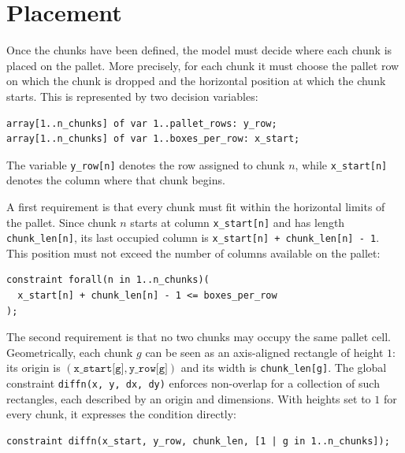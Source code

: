 \section{Placement}
\label{sec:placement}

Once the chunks have been defined, the model must decide where each chunk is
placed on the pallet. More precisely, for each chunk it must choose the pallet
row on which the chunk is dropped and the horizontal position at which the chunk
starts. This is represented by two decision variables:

\vspace{0.5cm}
\begin{lstlisting}
array[1..n_chunks] of var 1..pallet_rows: y_row;
array[1..n_chunks] of var 1..boxes_per_row: x_start;
\end{lstlisting}
\vspace{0.5cm}

The variable \texttt{y\_row[n]} denotes the row assigned to chunk \(n\), while
\texttt{x\_start[n]} denotes the column where that chunk begins.

A first requirement is that every chunk must fit within the horizontal limits of
the pallet. Since chunk \(n\) starts at column \texttt{x\_start[n]} and has
length \texttt{chunk\_len[n]}, its last occupied column is
\texttt{x\_start[n] + chunk\_len[n] - 1}. This position must not exceed the
number of columns available on the pallet:

\vspace{0.5cm}
\begin{lstlisting}
constraint forall(n in 1..n_chunks)(
  x_start[n] + chunk_len[n] - 1 <= boxes_per_row
);
\end{lstlisting}
\vspace{0.5cm}

The second requirement is that no two chunks may occupy the same pallet
cell. Geometrically, each chunk \(g\) can be seen as an axis-aligned
rectangle of height \(1\): its origin is \((\texttt{x\_start[g]},
\texttt{y\_row[g]})\) and its width is \texttt{chunk\_len[g]}. The global
constraint \texttt{diffn(x, y, dx, dy)} enforces non-overlap for a
collection of such rectangles, each described by an origin and dimensions.
With heights set to \(1\) for every chunk, it expresses the condition
directly:

\vspace{0.5cm}
\begin{lstlisting}
constraint diffn(x_start, y_row, chunk_len, [1 | g in 1..n_chunks]);
\end{lstlisting}
\vspace{0.5cm}

